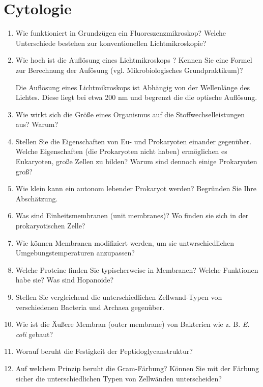 
\section{Cytologie}
	\begin{enumerate}
		\item Wie funktioniert in Grundzügen ein Fluoreszenzmikroskop? Welche Unterschiede bestehen zur konventionellen Lichtmikroskopie?
		\item Wie hoch ist die Auflösung eines Lichtmikroskops ? Kennen Sie eine Formel zur Berechnung der Aufösung (vgl. Mikrobiologisches Grundpraktikum)?

		Die Auflösung eines Lichtmikroskops ist Abhängig von der Wellenlänge des Lichtes.
		Diese liegt bei etwa 200 nm und begrenzt die die optische Auflösung.


		\item Wie wirkt sich die Größe eines Organismus auf die Stoffwechselleistungen aus? Warum?
		\item Stellen Sie die Eigenschaften von Eu- und Prokaryoten einander gegenüber. Welche Eigenschaften (die Prokaryoten nicht haben) ermöglichen es Eukaryoten, große Zellen zu bilden? Warum sind dennoch einige Prokaryoten groß?
		\item Wie klein kann ein autonom lebender Prokaryot werden? Begründen Sie Ihre Abschätzung.
		\item Was sind Einheitsmembranen (unit membranes)? Wo finden sie sich in der prokaryotischen Zelle?
		\item Wie können Membranen modifiziert werden, um sie untwrschiedlichen Umgebungstemperaturen anzupassen?
		\item Welche Proteine finden Sie typischerweise in Membranen? Welche Funktionen habe sie? Was sind Hopanoide?
		\item Stellen Sie vergleichend die unterschiedlichen Zellwand-Typen von verschiedenen Bacteria und Archaea gegenüber.
		\item Wie ist die Äußere Membran (outer membrane) von Bakterien wie  z. B. \emph{E. coli} gebaut?
		\item Worauf beruht  die Festigkeit der Peptidoglycanstruktur? 
		\item Auf welchem Prinzip beruht die Gram-Färbung? Können Sie mit der Färbung sicher die unterschiedlichen Typen von Zellwänden unterscheiden?
	\end{enumerate}

